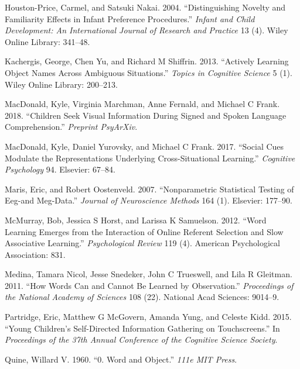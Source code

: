 \documentclass[10pt, letterpaper]{article}
\begin{document}
\leavevmode\hypertarget{ref-houston2004distinguishing}{}%
Houston-Price, Carmel, and Satsuki Nakai. 2004. ``Distinguishing Novelty
and Familiarity Effects in Infant Preference Procedures.'' \emph{Infant
and Child Development: An International Journal of Research and
Practice} 13 (4). Wiley Online Library: 341--48.

\leavevmode\hypertarget{ref-kachergis2013actively}{}%
Kachergis, George, Chen Yu, and Richard M Shiffrin. 2013. ``Actively
Learning Object Names Across Ambiguous Situations.'' \emph{Topics in
Cognitive Science} 5 (1). Wiley Online Library: 200--213.

\leavevmode\hypertarget{ref-macdonald2018speed}{}%
MacDonald, Kyle, Virginia Marchman, Anne Fernald, and Michael C Frank.
2018. ``Children Seek Visual Information During Signed and Spoken
Language Comprehension.'' \emph{Preprint PsyArXiv}.

\leavevmode\hypertarget{ref-macdonald2017social}{}%
MacDonald, Kyle, Daniel Yurovsky, and Michael C Frank. 2017. ``Social
Cues Modulate the Representations Underlying Cross-Situational
Learning.'' \emph{Cognitive Psychology} 94. Elsevier: 67--84.

\leavevmode\hypertarget{ref-maris2007nonparametric}{}%
Maris, Eric, and Robert Oostenveld. 2007. ``Nonparametric Statistical
Testing of Eeg-and Meg-Data.'' \emph{Journal of Neuroscience Methods}
164 (1). Elsevier: 177--90.

\leavevmode\hypertarget{ref-mcmurray2012word}{}%
McMurray, Bob, Jessica S Horst, and Larissa K Samuelson. 2012. ``Word
Learning Emerges from the Interaction of Online Referent Selection and
Slow Associative Learning.'' \emph{Psychological Review} 119 (4).
American Psychological Association: 831.

\leavevmode\hypertarget{ref-medina2011words}{}%
Medina, Tamara Nicol, Jesse Snedeker, John C Trueswell, and Lila R
Gleitman. 2011. ``How Words Can and Cannot Be Learned by Observation.''
\emph{Proceedings of the National Academy of Sciences} 108 (22).
National Acad Sciences: 9014--9.

\leavevmode\hypertarget{ref-partridge2015young}{}%
Partridge, Eric, Matthew G McGovern, Amanda Yung, and Celeste Kidd.
2015. ``Young Children's Self-Directed Information Gathering on
Touchscreens.'' In \emph{Proceedings of the 37th Annual Conference of
the Cognitive Science Society}.

\leavevmode\hypertarget{ref-quine19600}{}%
Quine, Willard V. 1960. ``0. Word and Object.'' \emph{111e MIT Press}.
\end{document}

